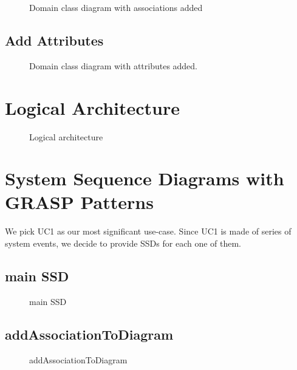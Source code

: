 \documentclass[12pt]{article}
\begin{document}
\begin{figure}[H]
  \centering
    
  \caption{Domain class diagram with associations added}  

\end{figure}

\subsection{Add Attributes}

\begin{figure}[H]
  \centering
    
  \caption{Domain class diagram with attributes added.}  
\end{figure}





\section{Logical Architecture}

\begin{figure}[H]
  \centering
    
  \caption{Logical architecture}
\end{figure}

\section{System Sequence Diagrams with GRASP Patterns}
We pick UC1 as our most significant use-case. Since UC1 is made of series of system events, we decide to provide SSDs for each one of them.

\subsection{main SSD}
\begin{figure}[H]
  \centering
    
  \caption{main SSD}
\end{figure}

\subsection{addAssociationToDiagram}
\begin{figure}[H]
  \centering
    
  \caption{addAssociationToDiagram}
\end{figure}
\end{document}
